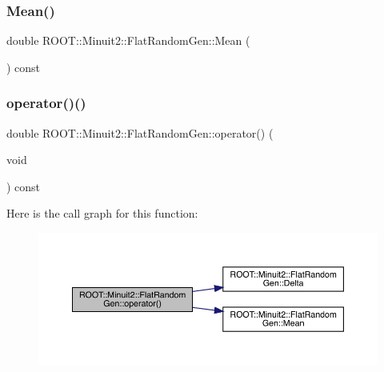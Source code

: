 \subsubsection{\texorpdfstring{Mean()}{Mean()}\hspace{0.1cm}{\footnotesize\ttfamily [2/2]}}
{\footnotesize\ttfamily double R\+O\+O\+T\+::\+Minuit2\+::\+Flat\+Random\+Gen\+::\+Mean (\begin{DoxyParamCaption}{ }\end{DoxyParamCaption}) const\hspace{0.3cm}{\ttfamily [inline]}}

\mbox{\label{classROOT_1_1Minuit2_1_1FlatRandomGen_ac04ef969864af18fdfdc104f2491e031}} 
\subsubsection{\texorpdfstring{operator()()}{operator()()}\hspace{0.1cm}{\footnotesize\ttfamily [1/2]}}
{\footnotesize\ttfamily double R\+O\+O\+T\+::\+Minuit2\+::\+Flat\+Random\+Gen\+::operator() (\begin{DoxyParamCaption}\item[{void}]{ }\end{DoxyParamCaption}) const\hspace{0.3cm}{\ttfamily [inline]}}

Here is the call graph for this function\+:
\nopagebreak
\begin{figure}[H]
\begin{center}
\leavevmode
\includegraphics[width=350pt]{dc/d91/classROOT_1_1Minuit2_1_1FlatRandomGen_ac04ef969864af18fdfdc104f2491e031_cgraph}
\end{center}
\end{figure}
\mbox{\label{classROOT_1_1Minuit2_1_1FlatRandomGen_ac04ef969864af18fdfdc104f2491e031}} 
